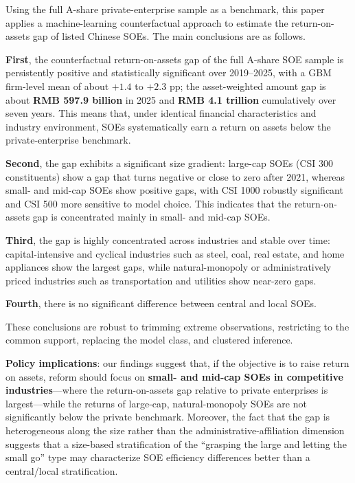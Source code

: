 \documentclass[11pt,a4paper]{article}
\begin{document}
Using the full A-share private-enterprise sample as a benchmark, this paper applies a machine-learning counterfactual approach to estimate the return-on-assets gap of listed Chinese SOEs. The main conclusions are as follows.

\textbf{First}, the counterfactual return-on-assets gap of the full A-share SOE sample is persistently positive and statistically significant over 2019--2025, with a GBM firm-level mean of about $+1.4$ to $+2.3$ pp; the asset-weighted amount gap is about \textbf{RMB 597.9 billion} in 2025 and \textbf{RMB 4.1 trillion} cumulatively over seven years. This means that, under identical financial characteristics and industry environment, SOEs systematically earn a return on assets below the private-enterprise benchmark.

\textbf{Second}, the gap exhibits a significant size gradient: large-cap SOEs (CSI 300 constituents) show a gap that turns negative or close to zero after 2021, whereas small- and mid-cap SOEs show positive gaps, with CSI 1000 robustly significant and CSI 500 more sensitive to model choice. This indicates that the return-on-assets gap is concentrated mainly in small- and mid-cap SOEs.

\textbf{Third}, the gap is highly concentrated across industries and stable over time: capital-intensive and cyclical industries such as steel, coal, real estate, and home appliances show the largest gaps, while natural-monopoly or administratively priced industries such as transportation and utilities show near-zero gaps.

\textbf{Fourth}, there is no significant difference between central and local SOEs.

These conclusions are robust to trimming extreme observations, restricting to the common support, replacing the model class, and clustered inference.

\textbf{Policy implications}: our findings suggest that, if the objective is to raise return on assets, reform should focus on \textbf{small- and mid-cap SOEs in competitive industries}---where the return-on-assets gap relative to private enterprises is largest---while the returns of large-cap, natural-monopoly SOEs are not significantly below the private benchmark. Moreover, the fact that the gap is heterogeneous along the size rather than the administrative-affiliation dimension suggests that a size-based stratification of the ``grasping the large and letting the small go'' type may characterize SOE efficiency differences better than a central/local stratification.
\end{document}
